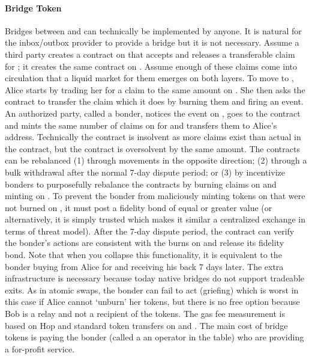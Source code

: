 \paragraph*{Bridge Token} Bridges between \layerone and \layertwo can technically be implemented by anyone. It is natural for the inbox/outbox provider to provide a bridge but it is not necessary. Assume a third party creates a contract on \layerone that accepts \ethone and releases a transferable claim for \ethone; it creates the same contract on \layertwo. Assume enough of these claims come into circulation that a liquid market for them emerges on both layers.  To move \ethtwo to \ethone, Alice starts by trading her \ethtwo for a claim to the same amount on \layertwo. She then asks the \layertwo contract to transfer the claim which it does by burning them and firing an event. An authorized party, called a bonder, notices the event on \layertwo, goes to the \layerone contract and mints the same number of claims on \layerone for \ethone and transfers them to Alice's address. Technically the \layerone contract is insolvent as more claims exist than actual \ethone in the contract, but the \layertwo contract is oversolvent by the same amount. The contracts can be rebalanced (1)  through movements in the opposite direction; (2) through a bulk withdrawal after the normal 7-day dispute period; or (3) by incentivize bonders to purposefully rebalance the contracts by burning claims on \layerone and minting on \layertwo. To prevent the bonder from maliciously minting tokens on \layerone that were not burned on \layertwo, it must post a fidelity bond of equal or greater value (or alternatively, it is simply trusted which makes it similar a centralized exchange in terms of threat model). After the 7-day dispute period, the \layerone contract can verify the bonder's actions are consistent with the burns on \layertwo and release its fidelity bond. Note that when you collapse this functionality, it is equivalent to the bonder buying \ethxx from Alice for \ethone and receiving his \ethone back 7 days later. The extra infrastructure is necessary because today native bridges do not support tradeable exits. As in atomic swaps, the bonder can fail to act (griefing) which is worst in this case if Alice cannot `unburn' her tokens, but there is no free option because Bob is a relay and not a recipient of the tokens. The gas fee measurement is based on Hop and standard token transfers on \layerone and \layertwo. The main cost of bridge tokens is paying the bonder (called a an operator in the table) who are providing a for-profit service. 


